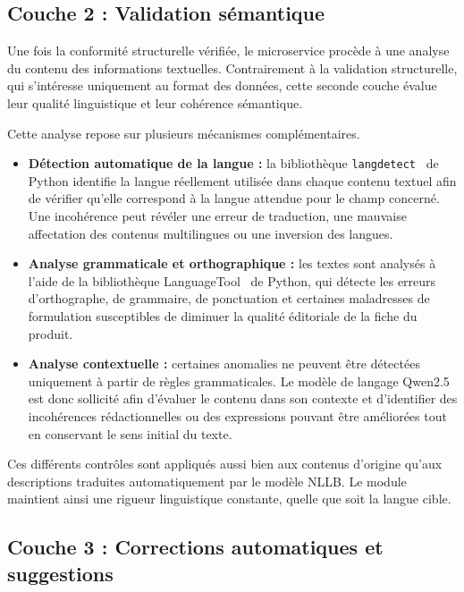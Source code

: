 \subsection{Couche 2 : Validation sémantique}

Une fois la conformité structurelle vérifiée, le microservice procède à une analyse du contenu des informations textuelles. Contrairement à la validation structurelle, qui s'intéresse uniquement au format des données, cette seconde couche évalue leur qualité linguistique et leur cohérence sémantique.

Cette analyse repose sur plusieurs mécanismes complémentaires.

\begin{itemize}
    \item \textbf{Détection automatique de la langue :} la bibliothèque \texttt{langdetect}~ de Python identifie la langue réellement utilisée dans chaque contenu textuel afin de vérifier qu'elle correspond à la langue attendue pour le champ concerné. Une incohérence peut révéler une erreur de traduction, une mauvaise affectation des contenus multilingues ou une inversion des langues.

    \item \textbf{Analyse grammaticale et orthographique :} les textes sont analysés à l'aide de la bibliothèque LanguageTool~ de Python, qui détecte les erreurs d'orthographe, de grammaire, de ponctuation et certaines maladresses de formulation susceptibles de diminuer la qualité éditoriale de la fiche du produit.

    \item \textbf{Analyse contextuelle :} certaines anomalies ne peuvent être détectées uniquement à partir de règles grammaticales. Le modèle de langage Qwen2.5~ est donc sollicité afin d'évaluer le contenu dans son contexte et d'identifier des incohérences rédactionnelles ou des expressions pouvant être améliorées tout en conservant le sens initial du texte.
\end{itemize}

Ces différents contrôles sont appliqués aussi bien aux contenus d'origine qu'aux descriptions traduites automatiquement par le modèle NLLB. Le module maintient ainsi une rigueur linguistique constante, quelle que soit la langue cible.
\subsection{Couche 3 : Corrections automatiques et suggestions}

